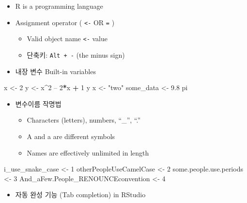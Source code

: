 \documentclass[]{book}
\newenvironment{Shaded}{\begin{snugshade}}{\end{snugshade}}
\newcommand{\DecValTok}[1]{\textcolor[rgb]{0.00,0.00,0.81}{#1}}
\newcommand{\FloatTok}[1]{\textcolor[rgb]{0.00,0.00,0.81}{#1}}
\newcommand{\StringTok}[1]{\textcolor[rgb]{0.31,0.60,0.02}{#1}}
\newcommand{\OperatorTok}[1]{\textcolor[rgb]{0.81,0.36,0.00}{\textbf{#1}}}
\newcommand{\NormalTok}[1]{#1}
\providecommand{\tightlist}{%
  \setlength{\itemsep}{0pt}\setlength{\parskip}{0pt}}
\begin{document}
\begin{itemize}
\tightlist
\item
  R is a programming language
\item
  Assignment operator ( \texttt{\textless{}-} OR \texttt{=} )

  \begin{itemize}
  \tightlist
  \item
    Valid object name \texttt{\textless{}-} value
  \item
    단축키: \texttt{Alt\ +\ -} (the minus sign)
  \end{itemize}
\item
  내장 변수 Built-in variables
\end{itemize}

\begin{Shaded}
\begin{Highlighting}[]
\NormalTok{x <-}\StringTok{ }\DecValTok{2}
\NormalTok{y <-}\StringTok{ }\NormalTok{x}\OperatorTok{^}\DecValTok{2}\NormalTok{ – }\DecValTok{2}\OperatorTok{*}\NormalTok{x }\OperatorTok{+}\StringTok{ }\DecValTok{1}
\NormalTok{y}
\NormalTok{x <-}\StringTok{ "two"}  
\NormalTok{some_data <-}\StringTok{ }\FloatTok{9.8}
\NormalTok{pi}
\end{Highlighting}
\end{Shaded}

\begin{itemize}
\tightlist
\item
  변수이름 작명법

  \begin{itemize}
  \tightlist
  \item
    Characters (letters), numbers, ``\_'', ``.''
  \item
    A and a are different symbols
  \item
    Names are effectively unlimited in length
  \end{itemize}
\end{itemize}

\begin{Shaded}
\begin{Highlighting}[]
\NormalTok{i_use_snake_case <-}\StringTok{ }\DecValTok{1}
\NormalTok{otherPeopleUseCamelCase <-}\StringTok{ }\DecValTok{2}
\NormalTok{some.people.use.periods <-}\StringTok{ }\DecValTok{3}
\NormalTok{And_aFew.People_RENOUNCEconvention <-}\StringTok{ }\DecValTok{4}
\end{Highlighting}
\end{Shaded}

\begin{itemize}
\tightlist
\item
  자동 완성 기능 (Tab completion) in RStudio
\end{itemize}
\end{document}
